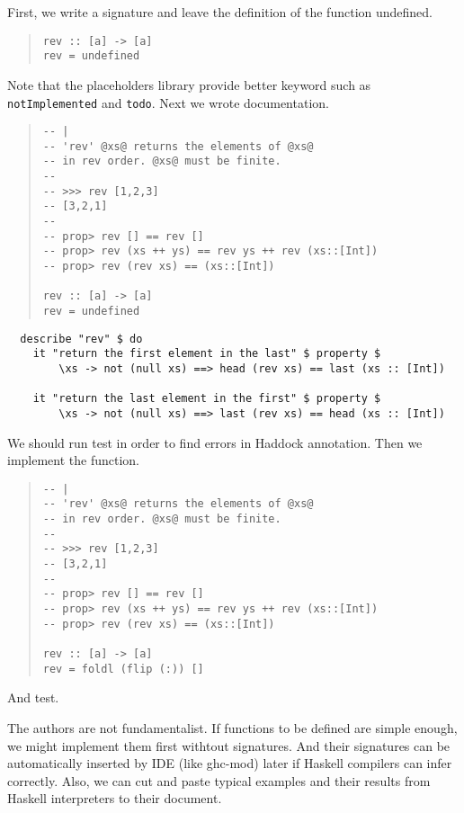 \documentclass[preprint]{sigplanconf}
\begin{document}
First, we write a signature and leave the definition of the function undefined.

\begin{quote}
\small
\begin{verbatim}
rev :: [a] -> [a]
rev = undefined
\end{verbatim}
\end{quote}

\noindent Note that the placeholders library provide better keyword such as {\tt notImplemented} and {\tt todo}. Next we wrote documentation.

\begin{quote}
\small
\begin{verbatim}
-- |
-- 'rev' @xs@ returns the elements of @xs@
-- in rev order. @xs@ must be finite.
-- 
-- >>> rev [1,2,3]
-- [3,2,1]
--
-- prop> rev [] == rev []
-- prop> rev (xs ++ ys) == rev ys ++ rev (xs::[Int])
-- prop> rev (rev xs) == (xs::[Int])

rev :: [a] -> [a]
rev = undefined
\end{verbatim}
\end{quote}


\begin{figure*}
\small
\begin{verbatim}
  describe "rev" $ do
    it "return the first element in the last" $ property $
        \xs -> not (null xs) ==> head (rev xs) == last (xs :: [Int])

    it "return the last element in the first" $ property $
        \xs -> not (null xs) ==> last (rev xs) == head (xs :: [Int])
\end{verbatim}
\end{figure*}

\noindent We should run test in order to find errors in Haddock annotation.
Then we implement the function.

\begin{quote}
\small
\begin{verbatim}
-- |
-- 'rev' @xs@ returns the elements of @xs@
-- in rev order. @xs@ must be finite.
-- 
-- >>> rev [1,2,3]
-- [3,2,1]
--
-- prop> rev [] == rev []
-- prop> rev (xs ++ ys) == rev ys ++ rev (xs::[Int])
-- prop> rev (rev xs) == (xs::[Int])

rev :: [a] -> [a]
rev = foldl (flip (:)) []
\end{verbatim}
\end{quote}

\noindent And test.

The authors are not fundamentalist.
If functions to be defined are simple enough,
we might implement them first withtout signatures.
And their signatures can be automatically
inserted by IDE (like ghc-mod) later
if Haskell compilers can infer correctly.
Also, we can cut and paste typical examples and their results
from Haskell interpreters to their document.
\end{document}
